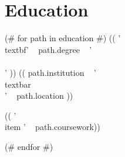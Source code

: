\documentclass[a4paper,10pt]{article}
\begin{document}
\section*{Education}
(# for path in education #) 
    (( '\\textbf{' ~ path.degree ~ '} \\\\' ))
    (( path.institution ~ ' \\textbar\\ ' ~ path.location ))
\begin{itemize}[itemsep=0em]
    (( '\\item ' ~ path.coursework))
\end{itemize}
(# endfor #)
\end{document}
